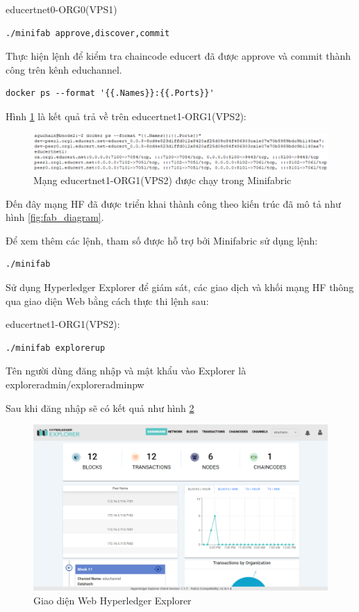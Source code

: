 \begin{enumerate}
    educertnet0-ORG0(VPS1)
     \begin{Verbatim}[fontsize=\small]
       ./minifab approve,discover,commit
    \end{Verbatim}
    
Thực hiện lệnh để kiểm tra chaincode educert đã được approve và commit thành công trên kênh educhannel.
     \begin{Verbatim}[fontsize=\small]
       docker ps --format '{{.Names}}:{{.Ports}}'
    \end{Verbatim}

Hình \ref{fig:educertnet1-ORG1_diagram} là kết quả trả về trên educertnet1-ORG1(VPS2):

    \begin{figure}[H]
    \centering
    \includegraphics[width=.9\linewidth]{img/educertnet1-ORG1.png}
    \caption{Mạng educertnet1-ORG1(VPS2) được chạy trong Minifabric}
    \label{fig:educertnet1-ORG1_diagram}
    \end{figure}


Đến đây mạng HF đã được triển khai thành công theo kiến trúc đã mô tả như hình \ref{fig:fab_diagram}.

Để xem thêm các lệnh, tham số được hỗ trợ bởi Minifabric  sử dụng lệnh: 
     \begin{Verbatim}[fontsize=\small]
       ./minifab
    \end{Verbatim}

Sử dụng Hyperledger Explorer để giám sát, các giao dịch và khối mạng HF thông qua giao diện Web bằng cách thực thi lệnh sau:

educertnet1-ORG1(VPS2):
     \begin{Verbatim}[fontsize=\small]
       ./minifab explorerup
    \end{Verbatim}
    
Tên người dùng đăng nhập và mật khẩu vào Explorer là exploreradmin/exploreradminpw

Sau khi đăng nhập sẽ có kết quả như hình \ref{fig:exploreradmin_diagram}

    \begin{figure}[H]
    \centering
    \includegraphics[width=.9\linewidth]{img/exploreradmin.png}
    \caption{Giao diện Web Hyperledger Explorer}
    \label{fig:exploreradmin_diagram}
    \end{figure}



\end{enumerate}
